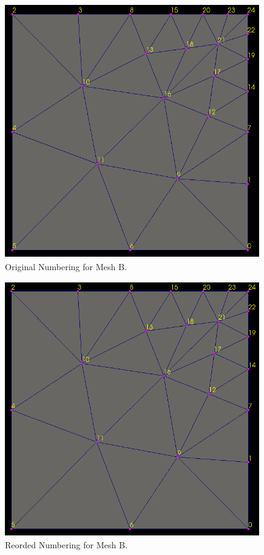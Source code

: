 \documentclass[a4paper, 12pt]{article}
\begin{document}
\begin{figure}[H]
  \centering
  \includegraphics[width=11cm, height=11cm]{orig_b}
  \caption{Original Numbering for Mesh B. }
  \label{fig_ob}
\end{figure}

\begin{figure}[H]
  \centering
  \includegraphics[width=11cm, height=11cm]{reorder_b} 
  \caption{Reorded Numbering for Mesh B. }
  \label{fig_rb}
\end{figure}
\end{document}
